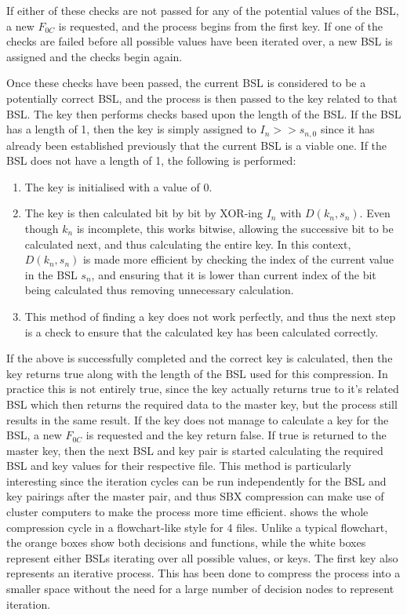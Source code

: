 \documentclass[10pt]{article}
\begin{document}
If either of these checks are not passed for any of the potential values of the BSL, a new $F_{0C}$ is requested, and the process begins from the first key. If one of the checks are failed before all possible values have been iterated over, a new BSL is assigned and the checks begin again.

Once these checks have been passed, the current BSL is considered to be a potentially correct BSL, and the process is then passed to the key related to that BSL. The key then performs checks based upon the length of the BSL. If the BSL has a length of 1, then the key is simply assigned to $I_n >> s_{n,0}$ since it has already been established previously that the current BSL is a viable one. If the BSL does not have a length of 1, the following is performed:
\begin{enumerate}
    \item The key is initialised with a value of 0.
    \item The key is then calculated bit by bit by XOR-ing $I_n$ with $D(k_n,s_n)$. Even though $k_n$ is incomplete, this works bitwise, allowing the successive bit to be calculated next, and thus calculating the entire key. In this context, $D(k_n,s_n)$ is made more efficient by checking the index of the current value in the BSL $s_n$, and ensuring that it is lower than current index of the bit being calculated thus removing unnecessary calculation.
    \item This method of finding a key does not work perfectly, and thus the next step is a check to ensure that the calculated key has been calculated correctly.
\end{enumerate}

If the above is successfully completed and the correct key is calculated, then the key returns true along with the length of the BSL used for this compression. In practice this is not entirely true, since the key actually returns true to it's related BSL which then returns the required data to the master key, but the process still results in the same result. If the key does not manage to calculate a key for the BSL, a  new $F_{0C}$ is requested and the key return false. If true is returned to the master key, then the next BSL and key pair is started calculating the required BSL and key values for their respective file. This method is particularly interesting since the iteration cycles can be run independently for the BSL and key pairings after the master pair, and thus SBX compression can make use of cluster computers to make the process more time efficient.  shows the whole compression cycle in a flowchart-like style for 4 files. Unlike a typical flowchart, the orange boxes show both decisions and functions, while the white boxes represent either BSLs iterating over all possible values, or keys. The first key also represents an iterative process. This has been done to compress the process into a smaller space without the need for a large number of decision nodes to represent iteration.
\end{document}
